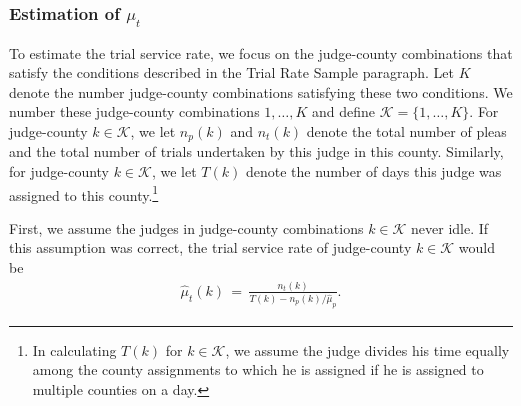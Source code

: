 \documentclass[11pt]{article}
\theoremstyle{ModifiedStyle}
\begin{document}
    \subsubsection{Estimation of $\mu_t$}
      \label{mu_t-estimation}
      To estimate the trial service rate, we focus on the judge-county combinations that satisfy the conditions described in the Trial Rate Sample paragraph. Let $K$ denote the number judge-county combinations satisfying these two conditions. We number these judge-county combinations $1,\ldots,K$ and define $\mathcal{K} = \{1,\ldots,K\}$. For judge-county $k \in \mathcal{K}$, we let $n_p(k)$ and $n_t(k)$ denote the total number of pleas and the total number of trials undertaken by this judge in this county. Similarly, for judge-county $k \in \mathcal{K}$, we let $T(k)$ denote the number of days this judge was assigned to this county.\footnote{In calculating $T(k)$ for $k\in\mathcal{K}$, we assume the judge divides his time equally among the county assignments to which he is assigned if he is assigned to multiple counties on a day.}

			First, we assume the judges in judge-county combinations $k\in\mathcal{K}$ never idle. If this assumption was correct, the trial service rate of judge-county $k\in\mathcal{K}$ would be
			\begin{align*}
				\hat{\mu}_t(k) \,=\, \frac{n_t(k)}{T(k) - n_p(k) / \hat{\mu}_p}.
			\end{align*}
\end{document}

